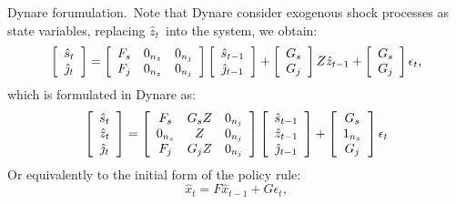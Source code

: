 \documentclass[a4paper,12pt]{article}%
\begin{document}
\textsf{Dynare forumulation.\ }Note that Dynare consider exogenous shock
processes as state variables, replacing $\hat{z}_{t}$\ into the system, we
obtain:
\begin{equation}
\left[
\begin{array}
[c]{c}%
\hat{s}_{t}\\
\hat{\jmath}_{t}%
\end{array}
\right]  =\left[
\begin{array}
[c]{ccc}%
F_{s} & 0_{n_{z}} & 0_{n_{j}}\\
F_{j} & 0_{n_{z}} & 0_{n_{j}}%
\end{array}
\right]  \left[
\begin{array}
[c]{c}%
\hat{s}_{t-1}\\
\hat{\jmath}_{t-1}%
\end{array}
\right]  +\left[
\begin{array}
[c]{c}%
G_{s}\\
G_{j}%
\end{array}
\right]  Z\hat{z}_{t-1}+\left[
\begin{array}
[c]{c}%
G_{s}\\
G_{j}%
\end{array}
\right]  \epsilon_{t}\text{,}%
\end{equation}
which is formulated in Dynare as$:$%
\begin{equation}
\left[
\begin{array}
[c]{c}%
\hat{s}_{t}\\
\hat{z}_{t}\\
\hat{\jmath}_{t}%
\end{array}
\right]  =\left[
\begin{array}
[c]{ccc}%
F_{s} & G_{s}Z & 0_{n_{j}}\\
0_{n_{s}} & Z & 0_{n_{j}}\\
F_{j} & G_{j}Z & 0_{n_{j}}%
\end{array}
\right]  \left[
\begin{array}
[c]{c}%
\hat{s}_{t-1}\\
\hat{z}_{t-1}\\
\hat{\jmath}_{t-1}%
\end{array}
\right]  +\left[
\begin{array}
[c]{c}%
G_{s}\\
1_{n_{z}}\\
G_{j}%
\end{array}
\right]  \epsilon_{t}%
\end{equation}
Or equivalently to the initial form of the policy rule:%
\begin{equation}
\hat{x}_{t}=F\hat{x}_{t-1}+G\epsilon_{t}, \label{eq PQ rule}%
\end{equation}
\end{document}
